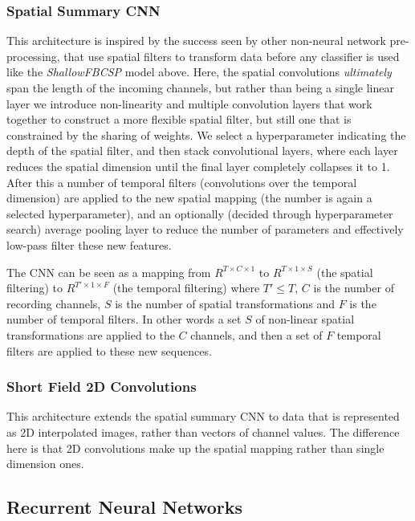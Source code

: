 \documentclass[utf8]{frontiersSCNS} %
\begin{document}
\subsubsection{Spatial Summary CNN} \label{sec:scnn}

This architecture is inspired by the success seen by other non-neural network pre-processing, that use spatial filters to transform data before any classifier is used like the \emph{ShallowFBCSP} model above. Here, the spatial convolutions \emph{ultimately} span the length of the incoming channels, but rather than being a single linear layer we introduce non-linearity and multiple convolution layers that work together to construct a more flexible spatial filter, but still one that is constrained by the sharing of weights. We select a hyperparameter indicating the depth of the spatial filter, and then stack convolutional layers, where each layer reduces the spatial dimension until the final layer completely collapses it to 1. After this a number of temporal filters (convolutions over the temporal dimension) are applied to the new spatial mapping (the number is again a selected hyperparameter), and an optionally (decided through hyperparameter search) average pooling layer to reduce the number of parameters and effectively low-pass filter these new features.

The CNN can be seen as a mapping from $R^{T \times C \times 1}$ to $R^{T \times 1 \times S}$ (the spatial filtering) to $R^{T' \times 1 \times F }$ (the temporal filtering) where $T' \leq T$, $C$ is the number of recording channels, $S$ is the number of spatial transformations and $F$ is the number of temporal filters. In other words a set $S$ of non-linear spatial transformations are applied to the $C$ channels, and then a set of $F$ temporal filters are applied to these new sequences. 

\subsubsection{Short Field 2D Convolutions}

This architecture extends the spatial summary CNN to data that is represented as 2D interpolated images, rather than vectors of channel values. The difference here is that 2D convolutions make up the spatial mapping rather than single dimension ones.
 
\subsection{Recurrent Neural Networks} \label{sec:rnns}
\end{document}
